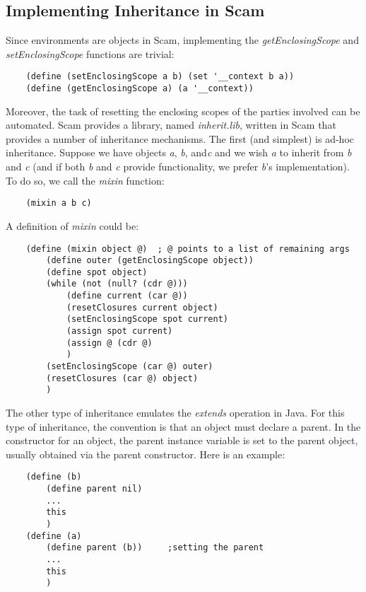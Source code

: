 \subsection{Implementing Inheritance in Scam}

Since environments are objects in Scam, implementing the {\it
getEnclosingScope} and {\it setEnclosingScope} functions are trivial:

\begin{verbatim}
    (define (setEnclosingScope a b) (set '__context b a))
    (define (getEnclosingScope a) (a '__context))
\end{verbatim}

Moreover, the task of resetting the enclosing scopes of the parties
involved can be automated. Scam provides a library, 
named {\it inherit.lib}, written in Scam that
provides a number of inheritance mechanisms. The first (and simplest)
is ad-hoc inheritance. Suppose we have objects {\it a}, {\it b}, and{\it  c}
and we wish
{\it a} to inherit from {\it b} and {\it c}
(and if both {\it b} and {\it c} provide functionality,
we prefer {\it b}'s implementation).
To do so, we call the {\it mixin} function:

\begin{verbatim}
    (mixin a b c)
\end{verbatim}

A definition of {\it mixin} could be:

\begin{verbatim}
    (define (mixin object @)  ; @ points to a list of remaining args
        (define outer (getEnclosingScope object))
        (define spot object)
        (while (not (null? (cdr @)))
            (define current (car @))
            (resetClosures current object)
            (setEnclosingScope spot current)
            (assign spot current)
            (assign @ (cdr @)
            )
        (setEnclosingScope (car @) outer)
        (resetClosures (car @) object)
        )
\end{verbatim}

The other type of inheritance emulates the {\it extends} operation in
Java.  For this type of inheritance, the convention is that an object
must declare a parent. In the constructor for an object, the parent
instance variable is set to the parent object, usually obtained via the
parent constructor.  Here is an example:

\begin{verbatim}
    (define (b)
        (define parent nil)
        ...
        this
        )
    (define (a)
        (define parent (b))     ;setting the parent 
        ...
        this
        )
\end{verbatim}

